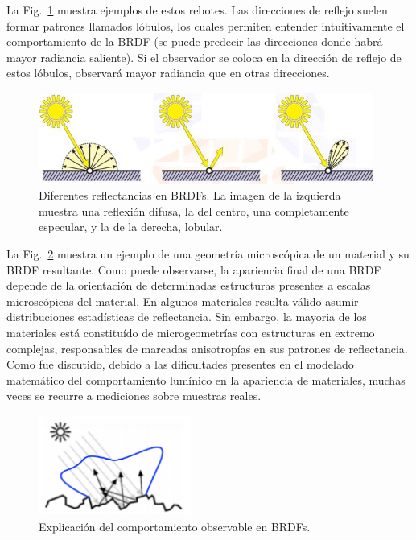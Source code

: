 La Fig.~\ref{fg:contribuciones} muestra ejemplos de estos rebotes.
Las direcciones de reflejo suelen formar patrones llamados lóbulos, los cuales permiten entender intuitivamente el comportamiento de la BRDF (se puede predecir las direcciones donde habrá mayor radiancia saliente).
Si el observador se coloca en la dirección de reflejo de estos lóbulos, observará mayor radiancia que en otras direcciones.

\begin{figure}
\center
\includegraphics[width=11cm]{figures/contribuciones}
\caption[Diferentes reflectancias en BRDFs]{Diferentes reflectancias en BRDFs. La imagen de la izquierda muestra una reflexión difusa, la del centro, una completamente especular, y la de la derecha, lobular.}
\label{fg:contribuciones}
\end{figure}

La Fig.~\ref{fg:microestructura} muestra un ejemplo de una geometría microscópica de un material y su BRDF resultante.
Como puede observarse, la apariencia final de una BRDF depende de la orientación de determinadas estructuras presentes a escalas microscópicas del material.
En algunos materiales resulta válido asumir distribuciones estadísticas de reflectancia.
Sin embargo, la mayoria de los materiales está constituído de microgeometrías con estructuras en extremo complejas, responsables de marcadas anisotropías en sus patrones de reflectancia.
Como fue discutido, debido a las dificultades presentes en el modelado matemático del comportamiento lumínico en la apariencia de materiales, muchas veces se recurre a mediciones sobre muestras reales.


\begin{figure}
\center
\includegraphics[width=5cm]{figures/microestructura}
\caption{Explicación del comportamiento observable en BRDFs.}
\label{fg:microestructura}
\end{figure}



